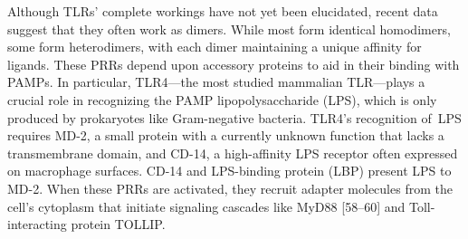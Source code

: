 Although TLRs' complete workings have not yet been elucidated, recent
data suggest that they often work as dimers. While most form identical
homodimers, some form heterodimers, with each dimer maintaining a unique
affinity for ligands. These PRRs depend upon accessory proteins to aid
in their binding with PAMPs. In particular, TLR4---the most studied
mammalian TLR---plays a crucial role in recognizing the PAMP
lipopolysaccharide (LPS), which is only produced by prokaryotes like
Gram-negative bacteria. TLR4's recognition of~LPS requires MD-2, a small
protein with a currently unknown function that lacks a transmembrane
domain, and CD-14, a high-affinity LPS receptor often expressed on
macrophage surfaces. CD-14 and LPS-binding protein (LBP) present LPS to
MD-2. When these PRRs are activated, they recruit adapter molecules from
the cell's cytoplasm that initiate signaling cascades like MyD88
{[}58--60{]} and Toll-interacting protein TOLLIP.
